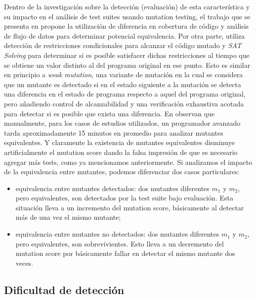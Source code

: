 Dentro de la investigaci\'on sobre la detecci\'on (evaluaci\'on) de esta caracter\'istica y su impacto en el an\'alisis de test suites usando mutation testing, el trabajo que se presenta en \cite{biblography.mutation.evaluation.equivalent.Schuler+10} propone la utilizaci\'on de diferencia en cobertura de c\'odigo y an\'alisis de flujo de datos para determinar potencial equivalencia. Por otra parte, \cite{biblography.mutation.evaluation.equivalent.Just+13} utiliza detecci\'on de restricciones condicionales para alcanzar el c\'odigo mutado y \emph{SAT Solving} para determinar si es posible satisfacer dichas restricciones al tiempo que se obtiene un valor distinto al del programa original en ese punto. Esto es similar en principio a \emph{weak mutation}, una variante de mutaci\'on en la cual se considera que un mutante es detectado si en el estado siguiente a la mutaci\'on se detecta una diferencia en el estado de programa respecto a aquel del programa original, pero a\~nadiendo control de alcanzabilidad y una verificaci\'on exhaustiva acotada para detectar si es posible que exista una diferencia.
En \cite{biblography.mutation.evaluation.equivalent.Grun+09} observan que manualmente, para los casos de estudios utilizados, un programador avanzado tarda aproximadamente 15 minutos en promedio para analizar mutantes equivalentes. Y claramente la existencia de mutantes equivalentes disminuye artificialmente el mutation score dando la falsa impresi\'on de que es necesario agregar m\'as tests, como ya mencionamos anteriormente. Si analizamos el impacto de la equivalencia entre mutantes, podemos diferenciar dos casos particulares: 
\begin{itemize}
\item equivalencia entre mutantes detectados: dos mutantes diferentes $m_1$ y $m_2$, pero equivalentes, son detectados por la test suite bajo evaluaci\'on. Esta situaci\'on lleva a un incremento del mutation score, b\'asicamente al detectar m\'as de una vez el mismo mutante; 

\item equivalencia entre mutantes no detectados: dos mutantes diferentes $m_1$ y $m_2$, pero equivalentes, son sobrevivientes. Esto lleva a un decremento del mutation score por b\'asicamente fallar en detectar el mismo mutante dos veces.
\end{itemize}



\subsection{Dificultad de detecci\'on}

